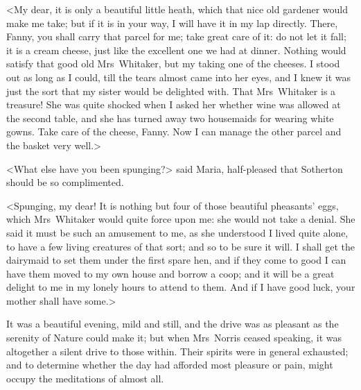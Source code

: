 <My dear, it is only a beautiful little heath, which that nice old gardener would make me take; but if it is in your way, I will have it in my lap directly. There, Fanny, you shall carry that parcel for me; take great care of it: do not let it fall; it is a cream cheese, just like the excellent one we had at dinner. Nothing would satisfy that good old Mrs~Whitaker, but my taking one of the cheeses. I stood out as long as I could, till the tears almost came into her eyes, and I knew it was just the sort that my sister would be delighted with. That Mrs~Whitaker is a treasure! She was quite shocked when I asked her whether wine was allowed at the second table, and she has turned away two housemaids for wearing white gowns. Take care of the cheese, Fanny. Now I can manage the other parcel and the basket very well.>

<What else have you been spunging?> said Maria, half-pleased that Sotherton should be so complimented.

<Spunging, my dear! It is nothing but four of those beautiful pheasants' eggs, which Mrs~Whitaker would quite force upon me: she would not take a denial. She said it must be such an amusement to me, as she understood I lived quite alone, to have a few living creatures of that sort; and so to be sure it will. I shall get the dairymaid to set them under the first spare hen, and if they come to good I can have them moved to my own house and borrow a coop; and it will be a great delight to me in my lonely hours to attend to them. And if I have good luck, your mother shall have some.>

It was a beautiful evening, mild and still, and the drive was as pleasant as the serenity of Nature could make it; but when Mrs~Norris ceased speaking, it was altogether a silent drive to those within. Their spirits were in general exhausted; and to determine whether the day had afforded most pleasure or pain, might occupy the meditations of almost all. 